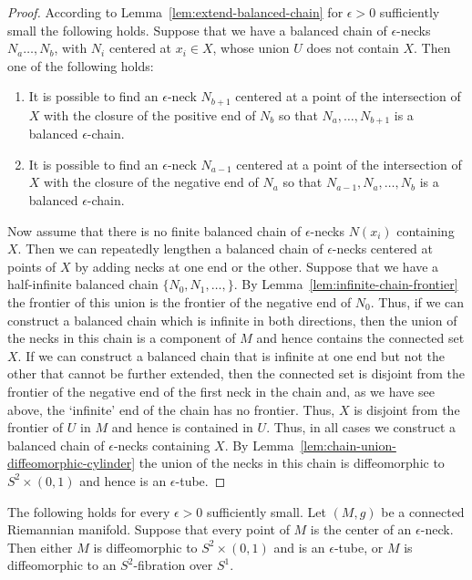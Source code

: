 \begin{proof}
According to Lemma~\ref{lem:extend-balanced-chain} for $\epsilon>0$ sufficiently
small the following holds. Suppose that we have a balanced chain of
$\epsilon$-necks $N_a\ldots,N_{b}$, with $N_i$ centered at $x_i\in
X$, whose union $U$  does not contain $X$.
 Then one of the following holds:
\begin{enumerate}
\item[(1)] It is possible to find an $\epsilon$-neck $N_{b+1}$ centered
at a point of the intersection of $X$ with the closure of the
positive end of $N_{b}$ so that $N_a,\ldots,N_{b+1}$ is a balanced
$\epsilon$-chain.
\item[(2)] It is possible to find an $\epsilon$-neck $N_{a-1}$ centered at a
point of the intersection of $X$ with the closure of the negative
end of $N_a$ so that $N_{a-1},N_a,\ldots,N_b$ is a balanced
$\epsilon$-chain.
\end{enumerate}


Now assume that there is no finite balanced chain of
$\epsilon$-necks $N(x_i)$ containing $X$. Then we can repeatedly
lengthen a balanced chain of $\epsilon$-necks centered at points of
$X$ by adding necks at one end or the other. Suppose that we have a
half-infinite balanced chain $\{N_0,N_1,\ldots,\}$. By
Lemma~\ref{lem:infinite-chain-frontier} the frontier of this union is the frontier
of the negative end of $N_0$. Thus, if we can construct a balanced
chain which is infinite in both directions, then the union of the
necks in this chain is a component of $M$ and hence contains the
connected set $X$. If we can construct a balanced chain that is
infinite at one end but not the other that cannot be further
extended, then the connected set is disjoint from the frontier of
the negative end of the first neck in the chain and, as we have see
above, the `infinite' end of the chain has no frontier. Thus, $X$ is
disjoint from the frontier of $U$ in $M$ and hence is contained in
$U$. Thus, in all cases we construct a balanced chain of
$\epsilon$-necks containing $X$. By Lemma~\ref{lem:chain-union-diffeomorphic-cylinder} the union
of the necks in this chain is diffeomorphic to $S^2\times (0,1)$ and
hence is an $\epsilon$-tube.
\end{proof}

\begin{lemma}
\label{lem:manifold-covered-by-necks-classification}
\label{S2times01}
The following holds for every $\epsilon>0$ sufficiently small. Let
$(M,g)$ be a connected Riemannian manifold. Suppose that every point
of $M$ is the center of an $\epsilon$-neck. Then either $M$ is
diffeomorphic to $S^2\times (0,1)$ and is an $\epsilon$-tube, or $M$
is diffeomorphic to an $S^2$-fibration over $S^1$.
\end{lemma}

